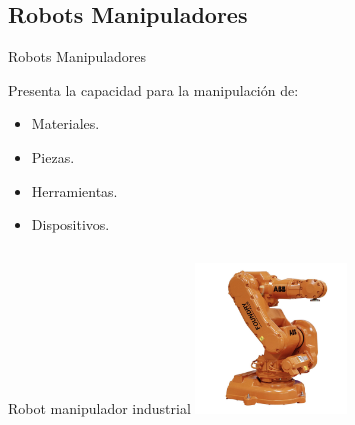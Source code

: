 \subsection{Robots Manipuladores}
\begin{frame}[shrink=20]{Robots Manipuladores}
	\begin{block}{}
		Presenta la capacidad para la manipulación de:
		\begin{itemize}
			\item Materiales.
			\item Piezas.
			\item Herramientas.
			\item Dispositivos.
		\end{itemize}
	\end{block}
	
	\vspace{0.4cm}
	\begin{columns}[T]
		\begin{column}{.33\textwidth}
			\begin{block}{\small{Robot manipulador industrial}}
				\centering
				\includegraphics[height=4cm,width=4cm]{Introduccion/ind-robot.jpg}
			\end{block}
		\end{column}
		

\end{columns}
\end{frame}
